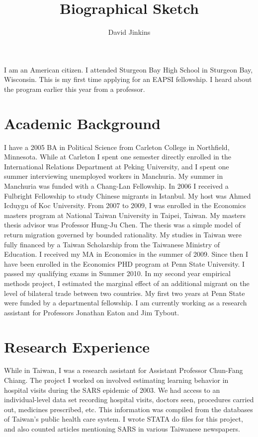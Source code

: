 \documentclass[a4paper,10pt]{article}
\title{Biographical Sketch}
\author{David Jinkins}
\begin{document}
\maketitle

I am an American citizen.  I attended Sturgeon Bay High School in Sturgeon Bay, Wisconsin.  This is my first time applying for an EAPSI fellowship.  I heard about the program earlier this year from a professor.    
\section*{Academic Background}
I have a 2005 BA in Political Science from Carleton College in Northfield, Minnesota.  While at Carleton I spent one semester directly enrolled in the International Relations Department at Peking University, and I spent one summer interviewing unemployed workers in Manchuria.  My summer in Manchuria was funded with a Chang-Lan Fellowship.  In 2006 I received a Fulbright Fellowship to study Chinese migrants in Istanbul.  My host was Ahmed Icduygu of Koc University.  From 2007 to 2009, I was enrolled in the Economics masters program at National Taiwan University in Taipei, Taiwan.  My masters thesis advisor was Professor Hung-Ju Chen.  The thesis was a simple model of return migration governed by bounded rationality.  My studies in Taiwan were fully financed by a Taiwan Scholarship from the Taiwanese Ministry of Education.  I received my MA in Economics in the summer of 2009. Since then I have been enrolled in the Economics PHD program at Penn State University.  I passed my qualifying exams in Summer 2010.  In my second year empirical methods project, I estimated the marginal effect of an additional migrant on the level of bilateral trade between two countries.  My first two years at Penn State were funded by a departmental fellowship.  I am currently working as a research assistant for Professors Jonathan Eaton and Jim Tybout.           

\section*{Research Experience}
While in Taiwan, I was a research assistant for Assistant Professor Chun-Fang Chiang.  The project I worked on involved estimating learning behavior in hospital visits during the SARS epidemic of 2003.  We had access to an individual-level data set recording hospital visits, doctors seen, procedures carried out, medicines prescribed, etc.  This information was compiled from the databases of Taiwan's public health care system.  I wrote STATA do files for this project, and also counted articles mentioning SARS in various Taiwanese newspapers.
\end{document}
